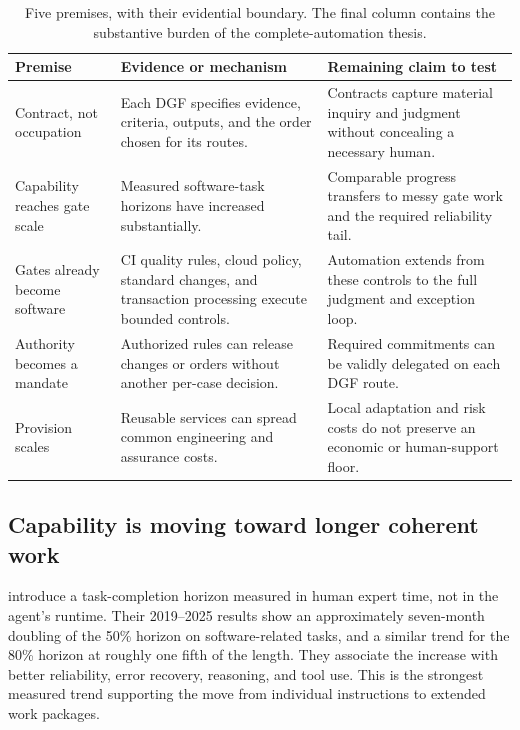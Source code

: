 \begin{table}[!htb]
\centering\small
\caption{Five premises, with their evidential boundary. The final column contains the substantive
burden of the complete-automation thesis.}
\label{tab:premises}
\begin{tabularx}{\linewidth}{@{}P{3.0cm}LL@{}}
\toprule
Premise & Evidence or mechanism & Remaining claim to test\\
\midrule
Contract, not occupation & Each DGF specifies evidence, criteria, outputs, and the order chosen for its
routes. & Contracts
capture material inquiry and judgment without concealing a necessary human.\\
Capability reaches gate scale & Measured software-task horizons have increased substantially. &
Comparable progress transfers to messy gate work and the required reliability tail.\\
Gates already become software & CI quality rules, cloud policy, standard changes, and transaction
processing execute bounded controls. & Automation extends from these controls to the full judgment and
exception loop.\\
Authority becomes a mandate & Authorized rules can release changes or orders without another per-case
decision. & Required commitments can be validly delegated on each DGF route.\\
Provision scales & Reusable services can spread common engineering and assurance costs. & Local
adaptation and risk costs do not preserve an economic or human-support floor.\\
\bottomrule
\end{tabularx}
\end{table}

\subsection{Capability is moving toward longer coherent work}
\label{sec:capability}

\citet{kwa2025} introduce a task-completion horizon measured in human expert time, not in the agent's
runtime. Their 2019--2025 results show an approximately seven-month doubling of the 50\% horizon on
software-related tasks, and a similar trend for the 80\% horizon at roughly one fifth of the length.
They associate the increase with better reliability, error recovery, reasoning, and tool use. This is
the strongest measured trend supporting the move from individual instructions to extended work
packages.

